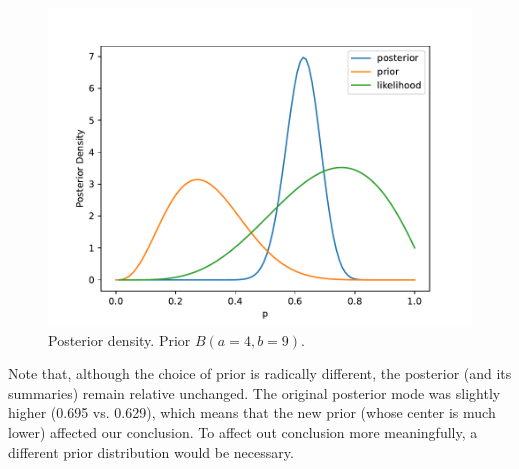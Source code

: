 
\begin{figure}[H]
    \centering
    \includegraphics[width=0.8\linewidth]{images/new_bnb_posterior_density.pdf}
    \caption{Posterior density. Prior $B(a=4, b=9)$.}
    \label{fig:new-posterior}
\end{figure}

\begin{center}
    
\end{center}

Note that, although the choice of prior is radically different, the posterior (and its summaries) remain relative unchanged. The original posterior mode was slightly higher (0.695 vs. 0.629), which means that the new prior (whose center is much lower) affected our conclusion. To affect out conclusion more meaningfully, a different prior distribution would be necessary. 
